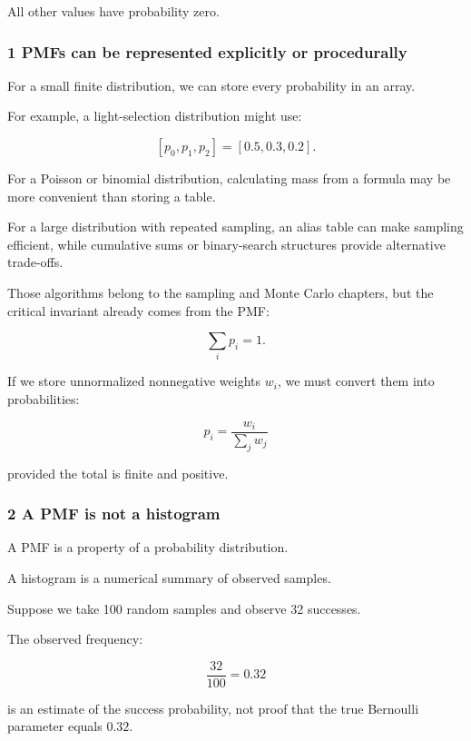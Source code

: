 All other values have probability zero.

\subsubsection{1 PMFs can be represented explicitly or procedurally}\label{02-foundations-ii-ch023-pmfs-can-be-represented-explicitly-or-procedurally}

\hypertarget{02-foundations-ii-ch023-pmfs-can-be-represented-explicitly-or-procedurally}{}

For a small finite distribution, we can store every probability in an array.

For example, a light-selection distribution might use:

\[
 [p_0,p_1,p_2]=[0.5,0.3,0.2].
\]

For a Poisson or binomial distribution, calculating mass from a formula may be more convenient than storing a table.

For a large distribution with repeated sampling, an alias table can make sampling efficient, while cumulative sums or binary-search structures provide alternative trade-offs.

Those algorithms belong to the sampling and Monte Carlo chapters, but the critical invariant already comes from the PMF:

\[
 \sum_ip_i=1.
\]

If we store unnormalized nonnegative weights \(w_i\), we must convert them into probabilities:

\[
 \boxed{ p_i=\frac{w_i}{\sum_jw_j} }
\]

provided the total is finite and positive.

\subsubsection{2 A PMF is not a histogram}\label{02-foundations-ii-ch023-a-pmf-is-not-a-histogram}

\hypertarget{02-foundations-ii-ch023-a-pmf-is-not-a-histogram}{}

A PMF is a property of a probability distribution.

A histogram is a numerical summary of observed samples.

Suppose we take 100 random samples and observe 32 successes.

The observed frequency:

\[
 \frac{32}{100}=0.32
\]

is an estimate of the success probability, not proof that the true Bernoulli parameter equals \(0.32\).

